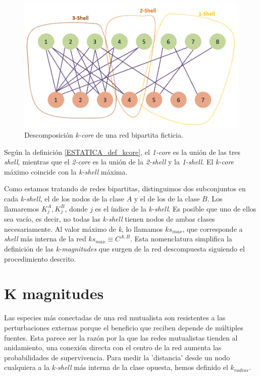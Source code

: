 \begin{figure}[h!]
\centering
\includegraphics[scale=0.5]{Figures/ESTATICA_kcore_decomposition_example.png}
\caption[PolarExample]{Descomposición \textit{k-core} de una red bipartita ficticia.}
\label{fig:ESTATICA_kcore_decomposition_example}
\end{figure}

Según la definición \ref{ESTATICA_def_kcore}, el  \textit{1-core} es la unión de las tres \textit{shell}, mientras que el \textit{2-core} es la unión de la \textit{2-shell} y la \textit{1-shell}. El \textit{k-core} máximo coincide con la  \textit{k-shell} máxima. 

Como estamos tratando de redes bipartitas, distinguimos dos subconjuntos en cada \textit{k-shell}, el de los nodos de la clase $A$ y el de los de la clase $B$. Los llamaremos $K^{A}_{j}, K^{B}_{j}$, donde  $j$ es el índice de la \textit{k-shell}.
Es posible que uno de ellos sea vacío, es decir, no todas las \textit{k-shell} tienen nodos de ambas clases necesariamente.
Al valor máximo de \textit{k}, lo llamamos $ks_{max}$, que corresponde a \textit{shell} más interna de la red $ks_{max}\equiv C^{A,B}$. Esta nomenclatura simplifica la definición de las \textit{k-magnitudes} que surgen de la red descompuesta siguiendo el procedimiento descrito.


\section{K magnitudes}

Las especies más conectadas de una red mutualista son resistentes a las perturbaciones externas porque el beneficio que reciben depende de múltiples fuentes. Esta parece ser la razón por la que las redes mutualistas tienden al anidamiento, una conexión directa con el centro de la red aumenta las probabilidades de supervivencia. Para medir la 'distancia' desde un nodo cualquiera a la \textit{k-shell} más interna de la clase opuesta, hemos definido el \textit{$k_{radius}$}.

